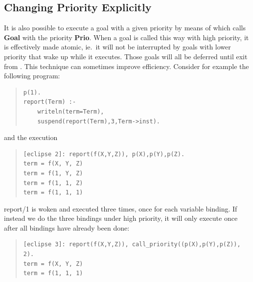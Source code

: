 \subsection{Changing Priority Explicitly}
It is also possible to execute a goal with a given priority
by means of
which calls {\bf Goal} with the priority {\bf Prio}.
When a goal is called this way with high priority, it is effectively
made atomic, ie.\ it will not be interrupted by goals with lower priority
that wake up while it executes.
Those goals will all be deferred until exit from
.
This technique can sometimes improve efficiency.
Consider for example the following program:
\begin{quote}\begin{verbatim}
p(1).
report(Term) :-
    writeln(term=Term),
    suspend(report(Term),3,Term->inst).
\end{verbatim}\end{quote}
and the execution
\begin{quote}\begin{verbatim}
[eclipse 2]: report(f(X,Y,Z)), p(X),p(Y),p(Z).
term = f(X, Y, Z)
term = f(1, Y, Z)
term = f(1, 1, Z)
term = f(1, 1, 1)
\end{verbatim}\end{quote}
report/1 is woken and executed three times, once for each variable binding.
If instead we do the three bindings under high priority, it will only
execute once after all bindings have already been done:
\begin{quote}\begin{verbatim}
[eclipse 3]: report(f(X,Y,Z)), call_priority((p(X),p(Y),p(Z)), 2).
term = f(X, Y, Z)
term = f(1, 1, 1)
\end{verbatim}\end{quote}


